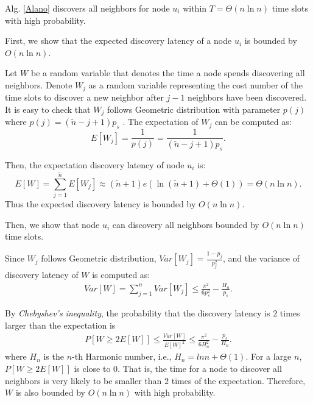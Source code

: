 \begin{theorem}
Alg. \ref{Alano} discovers all neighbors for node $u_i$ within $T=\Theta(n\ln n)$ time slots with high probability.
\end{theorem}
\begin{IEEEproof} First, we show that the expected discovery latency of a node $u_i$ is bounded by $O(n\ln n)$.

Let $W$ be a random variable that denotes the time a node spends discovering all neighbors. Denote $W_j$ as a random variable representing the cost number of the time slots to discover a new neighbor after $j-1$ neighbors have been discovered. It is easy to check that $W_j$ follows Geometric distribution with parameter $p(j)$ where $p(j)=(\widetilde{n}-j+1)p_s$ \cite{Motwani1995Randomized}. The expectation
of $W_j$ can be computed as:
$$
E[W_j]=\frac{1}{p(j)}=\frac{1}{(\widetilde{n}-j+1)p_s}.
$$

Then, the expectation discovery latency of node $u_i$ is:
$$
E[W] = \sum_{j=1}^{\widetilde{n}}E[W_j] \approx (\widetilde{n}+1)e(\ln (\widetilde{n}+1) + \Theta(1)) = \Theta(n\ln n).
$$
Thus the expected discovery latency is bounded by $O(n\ln n)$.

Then, we show that node $u_i$ can discovery all neighbors bounded by $O(n\ln n)$ time slots.

Since $W_j$ follows Geometric distribution, $Var[W_j]=\frac{1-p_j}{p_j^2}$, and the variance of discovery latency of $W$ is computed as:
\begin{displaymath}
\begin{split}
 Var[W] %
 =\sum_{j=1}^{n}Var[W_j]
 \le\frac{\pi^2}{6p_{s}^2}-\frac{H_n}{p_{s}}.
\end{split}
\end{displaymath}

By \emph{Chebyshev's inequality}, the probability that the discovery latency is $2$ times larger than the expectation is
\begin{displaymath}
\begin{split}
P[W\ge2E[W]]%
\le\frac{Var[W]}{{E[W]}^2}
\le\frac{\pi^2}{6H_{n}^2}-\frac{p_{s}}{H_n}.
\end{split}
\end{displaymath}
where $H_n$ is the $n$-th Harmonic number, i.e., $H_n = lnn + \Theta(1)$. For a large $n$, $P[W\ge2E[W]]$ is close to $0$. That is, the time for a node to discover all neighbors is very likely to be smaller than $2$ times of the expectation. Therefore, $W$ is also bounded by $O(n\ln n)$ with high probability.
\end{IEEEproof}



